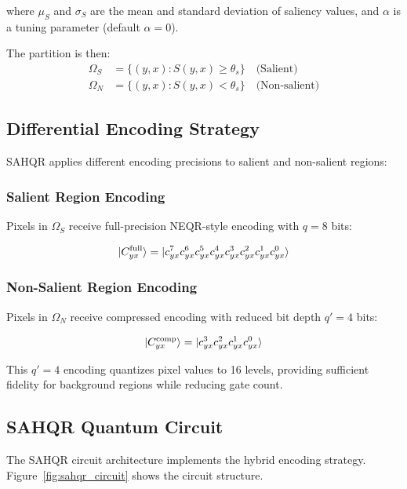 \documentclass{ipol}
\begin{document}
where $\mu_S$ and $\sigma_S$ are the mean and standard deviation of saliency values, and $\alpha$ is a tuning parameter (default $\alpha = 0$).

The partition is then:
\begin{align}
\Omega_S &= \{(y, x) : S(y, x) \geq \theta_s\} \quad \text{(Salient)} \\
\Omega_N &= \{(y, x) : S(y, x) < \theta_s\} \quad \text{(Non-salient)}
\end{align}

\subsection{Differential Encoding Strategy}

SAHQR applies different encoding precisions to salient and non-salient regions:

\subsubsection{Salient Region Encoding}

Pixels in $\Omega_S$ receive full-precision NEQR-style encoding with $q = 8$ bits:

\begin{equation}
\ket{C_{yx}^{\text{full}}} = \ket{c^7_{yx} c^6_{yx} c^5_{yx} c^4_{yx} c^3_{yx} c^2_{yx} c^1_{yx} c^0_{yx}}
\label{eq:full_encoding}
\end{equation}

\subsubsection{Non-Salient Region Encoding}

Pixels in $\Omega_N$ receive compressed encoding with reduced bit depth $q' = 4$ bits:

\begin{equation}
\ket{C_{yx}^{\text{comp}}} = \ket{c^3_{yx} c^2_{yx} c^1_{yx} c^0_{yx}}
\label{eq:comp_encoding}
\end{equation}

This $q' = 4$ encoding quantizes pixel values to 16 levels, providing sufficient fidelity for background regions while reducing gate count.

\subsection{SAHQR Quantum Circuit}

The SAHQR circuit architecture implements the hybrid encoding strategy. Figure~\ref{fig:sahqr_circuit} shows the circuit structure.
\end{document}

